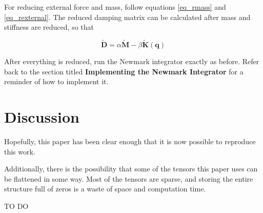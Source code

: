 \documentclass[twocolumn,10pt]{asme2ej}
\begin{document}
For reducing external force and mass, follow equations \ref{eq_rmass} and \ref{eq_rexternal}. The reduced damping matrix can be calculated after mass and stiffness are reduced, so that

\begin{equation}
  \bm{\tilde{D}} = \alpha\bm{\tilde{M}} - \beta\bm{\tilde{K}}(\bm{q})
\end{equation}

After everything is reduced, run the Newmark integrator exactly as before. Refer back to the section titled \textbf{Implementing the Newmark Integrator} for a reminder of how to implement it.

\section{Discussion}

Hopefully, this paper has been clear enough that it is now possible to reproduce this work.

Additionally, there is the possibility that some of the tensors this paper uses can be flattened in some way. Most of the tensors are sparse, and storing the entire structure full of zeros is a waste of space and computation time.

\begin{acknowledgment}

TO DO

\end{acknowledgment}





\end{document}
